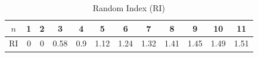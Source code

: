 \documentclass[journal,article,submit,pdftex,moreauthors]{Definitions/mdpi}
\begin{document}
\begin{table}[H]
    \caption{Random Index (RI)}
    \label{random-index}
    \centering
    \begin{tabular}{c|ccccccccccc}
        \toprule
        $n$ & 1 & 2 & 3 & 4 & 5 & 6 & 7 & 8 & 9 & 10 & 11 \\
        \midrule
        RI & 0 & 0 & 0.58 & 0.9 & 1.12 & 1.24 & 1.32 & 1.41 & 1.45 & 1.49 & 1.51 \\
        \bottomrule
    \end{tabular}
\end{table}








\end{document}
